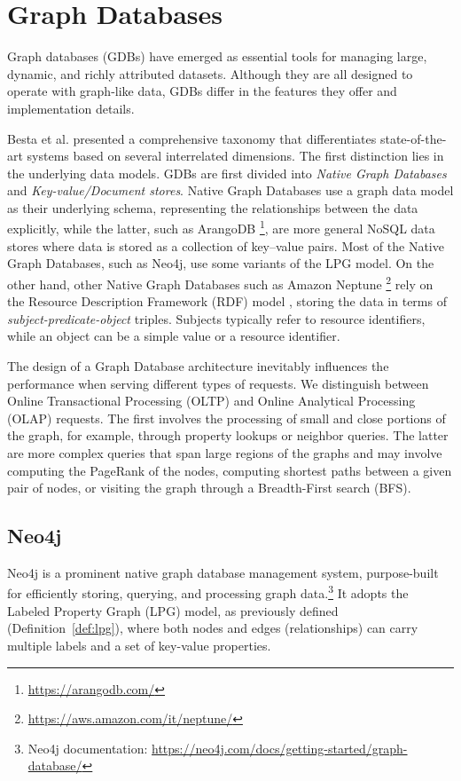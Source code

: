 \section{Graph Databases}


Graph databases (GDBs) have emerged as essential tools for managing large, dynamic, and richly attributed datasets. Although they are all designed to operate with graph-like data, GDBs differ in the features they offer and implementation details.

Besta et al. \cite{gdb-eth} presented a comprehensive taxonomy that differentiates state-of-the-art systems based on several interrelated dimensions. The first distinction lies in the underlying data models. GDBs are first divided into \emph{Native Graph Databases} and \emph{Key-value/Document stores}. Native Graph Databases use a graph data model as their underlying schema, representing the relationships between the data explicitly, while the latter, such as ArangoDB \footnote{\url{https://arangodb.com/}}, are more general NoSQL data stores where data is stored as a collection of key–value pairs. Most of the Native Graph Databases, such as Neo4j, use some variants of the LPG model. On the other hand, other Native Graph Databases such as Amazon Neptune \footnote{\url{https://aws.amazon.com/it/neptune/}} rely on the Resource Description Framework (RDF) model \cite{rdf}, storing the data in terms of \emph{subject-predicate-object} triples. Subjects typically refer to resource identifiers, while an object can be a simple value or a resource identifier. 

The design of a Graph Database architecture inevitably influences the performance when serving different types of requests. We distinguish between Online Transactional Processing (OLTP) and Online Analytical Processing (OLAP) requests. The first involves the processing of small and close portions of the graph, for example, through property lookups or neighbor queries. The latter are more complex queries that span large regions of the graphs and may involve computing the PageRank \cite{pagerank} of the nodes, computing shortest paths between a given pair of nodes, or visiting the graph through a Breadth-First search (BFS).

\subsection{Neo4j}

Neo4j is a prominent native graph database management system, purpose-built for efficiently storing, querying, and processing graph data.\footnote{Neo4j documentation: \url{https://neo4j.com/docs/getting-started/graph-database/}} It adopts the Labeled Property Graph (LPG) model, as previously defined (Definition~\ref{def:lpg}), where both nodes and edges (relationships) can carry multiple labels and a set of key-value properties.

